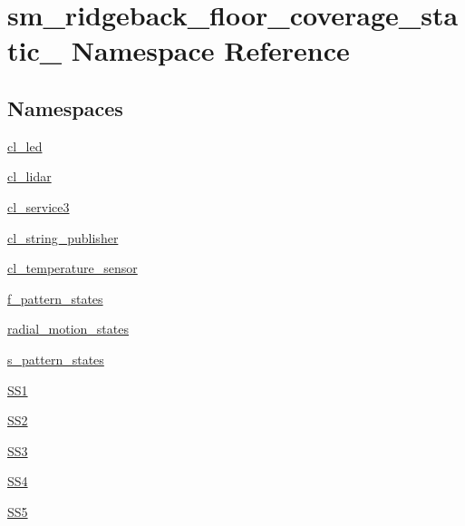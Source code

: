 \hypertarget{namespacesm__ridgeback__floor__coverage__static__1}{}\section{sm\+\_\+ridgeback\+\_\+floor\+\_\+coverage\+\_\+static\+\_ Namespace Reference}
\label{namespacesm__ridgeback__floor__coverage__static__1}
\subsection*{Namespaces}
\begin{DoxyCompactItemize}
\item 
 \hyperlink{namespacesm__ridgeback__floor__coverage__static__1_1_1cl__led}{cl\+\_\+led}
\item 
 \hyperlink{namespacesm__ridgeback__floor__coverage__static__1_1_1cl__lidar}{cl\+\_\+lidar}
\item 
 \hyperlink{namespacesm__ridgeback__floor__coverage__static__1_1_1cl__service3}{cl\+\_\+service3}
\item 
 \hyperlink{namespacesm__ridgeback__floor__coverage__static__1_1_1cl__string__publisher}{cl\+\_\+string\+\_\+publisher}
\item 
 \hyperlink{namespacesm__ridgeback__floor__coverage__static__1_1_1cl__temperature__sensor}{cl\+\_\+temperature\+\_\+sensor}
\item 
 \hyperlink{namespacesm__ridgeback__floor__coverage__static__1_1_1f__pattern__states}{f\+\_\+pattern\+\_\+states}
\item 
 \hyperlink{namespacesm__ridgeback__floor__coverage__static__1_1_1radial__motion__states}{radial\+\_\+motion\+\_\+states}
\item 
 \hyperlink{namespacesm__ridgeback__floor__coverage__static__1_1_1s__pattern__states}{s\+\_\+pattern\+\_\+states}
\item 
 \hyperlink{namespacesm__ridgeback__floor__coverage__static__1_1_1SS1}{S\+S1}
\item 
 \hyperlink{namespacesm__ridgeback__floor__coverage__static__1_1_1SS2}{S\+S2}
\item 
 \hyperlink{namespacesm__ridgeback__floor__coverage__static__1_1_1SS3}{S\+S3}
\item 
 \hyperlink{namespacesm__ridgeback__floor__coverage__static__1_1_1SS4}{S\+S4}
\item 
 \hyperlink{namespacesm__ridgeback__floor__coverage__static__1_1_1SS5}{S\+S5}
\end{DoxyCompactItemize}
